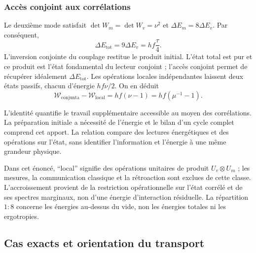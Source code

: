 \subsubsection{Accès conjoint aux corrélations}
\label{md:aux:acceso-conjunto}

Le deuxième mode satisfait $\det W_m=\det W_v=\nu^2$ et
$\Delta E_m=8\Delta E_v$. Par conséquent,
\begin{equation}
 \Delta E_{\mathrm{tot}}=9\Delta E_v=hf\frac\tau4.
 \label{md:aux:energia-conjunta}
\end{equation}
L’inversion conjointe du couplage restitue le produit
initial. L’état total est pur et ce produit est l’état
fondamental du lecteur conjoint ; l’accès conjoint permet de
récupérer idéalement $\Delta E_{\mathrm{tot}}$.
Les opérations locales indépendantes laissent deux états
passifs, chacun d’énergie $hf\nu/2$. On en déduit
\begin{equation}
 \boxed{\mathcal W_{\mathrm{conjunta}}-\mathcal W_{\mathrm{local}}
 =hf(\nu-1)=hf(\mu^{-1}-1).}
 \label{md:aux:ventaja-conjunta}
\end{equation}

L’identité quantifie le travail supplémentaire accessible
au moyen des corrélations. La préparation initiale a nécessité
de l’énergie et le bilan d’un cycle complet comprend cet apport.
La relation compare des lectures énergétiques et des opérations sur
l’état, sans identifier l’information et l’énergie à une
même grandeur physique.

Dans cet énoncé, ``local'' signifie des opérations unitaires de produit
$U_v\otimes U_m$ ; les mesures,
la communication classique et la rétroaction sont exclues de cette classe. L’accroissement
provient de la restriction opérationnelle sur l’état
corrélé et de ses spectres marginaux, non d’une
énergie d’interaction résiduelle. La répartition $1:8$ concerne
les énergies au-dessus du vide, non les énergies
totales ni les ergotropies.

\subsection{Cas exacts et orientation du transport}
\label{md:aux:casos-energia}

